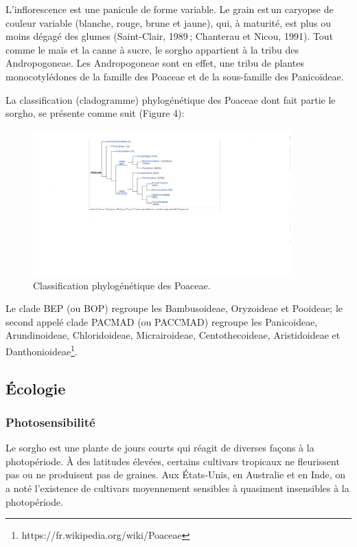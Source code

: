 \documentclass[a4paper,11pt]{article}
\begin{document}
L’inflorescence est une panicule de forme variable. Le grain est\,un
caryopse de couleur variable (blanche, rouge, brune et jaune), qui, à
maturité, est plus ou moins dégagé des glumes (Saint-Clair, 1989\,;
Chanterau et Nicou, 1991).  Tout comme le maïs et la canne à sucre, le
sorgho appartient à la tribu des Andropogoneae. Les Andropogoneae sont
en effet, une tribu de plantes monocotylédones de la famille des
Poaceae et de la sous-famille des Panicoïdeae.

La classification (cladogramme) phylogénétique des Poaceae dont fait
partie le sorgho, se présente comme suit (Figure 4):



\begin{figure}%
  \begin{center}
    \includegraphics[width=10cm]{images/PhylogenyPoacea}
  \end{center}
\caption{Classification phylogénétique des Poaceae.}
\end{figure}


Le clade BEP (ou BOP) regroupe les Bambusoideae, Oryzoideae et
Pooideae; le second appelé clade PACMAD (ou PACCMAD) regroupe les
Panicoideae, Arundinoideae, Chloridoideae, Micrairoideae,
Centothecoideae, Aristidoideae et
Danthonioideae\footnote{https://fr.wikipedia.org/wiki/Poaceae}.

\subsection{Écologie}

\subsubsection{Photosensibilité}

Le sorgho est une plante de jours courts qui réagit de diverses façons
à la photopériode. À des latitudes élevées, certains cultivars
tropicaux ne fleurissent pas ou ne produisent pas de graines. Aux
États-Unis, en Australie et en Inde, on a noté l’existence de
cultivars moyennement sensibles à quasiment insensibles à la
photopériode\cite{BARRO_KONDOMBO_2010}.
\end{document}
